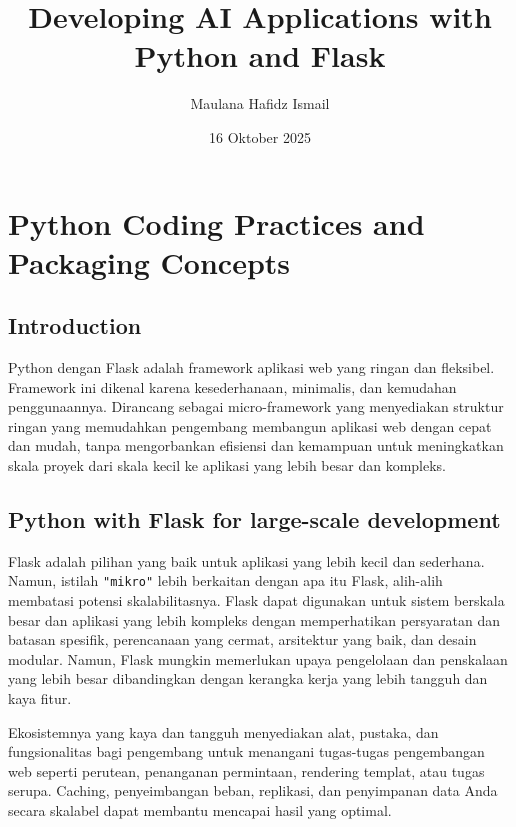 \documentclass{article}
\title{Developing AI Applications with Python and Flask}
\date{16 Oktober 2025}
\author{Maulana Hafidz Ismail}
\begin{document}
\maketitle
\newpage

\tableofcontents
\newpage
{}

\section{Python Coding Practices and Packaging Concepts}
\subsection{Introduction}
Python dengan Flask adalah framework aplikasi web yang ringan dan fleksibel. Framework ini dikenal karena kesederhanaan, minimalis, dan kemudahan penggunaannya. Dirancang sebagai micro-framework yang menyediakan struktur ringan yang memudahkan pengembang membangun aplikasi web dengan cepat dan mudah, tanpa mengorbankan efisiensi dan kemampuan untuk meningkatkan skala proyek dari skala kecil ke aplikasi yang lebih besar dan kompleks.


\subsection{Python with Flask for large-scale development}
Flask adalah pilihan yang baik untuk aplikasi yang lebih kecil dan sederhana. Namun, istilah \verb|"mikro"| lebih berkaitan dengan apa itu Flask, alih-alih membatasi potensi skalabilitasnya. Flask dapat digunakan untuk sistem berskala besar dan aplikasi yang lebih kompleks dengan memperhatikan persyaratan dan batasan spesifik, perencanaan yang cermat, arsitektur yang baik, dan desain modular. Namun, Flask mungkin memerlukan upaya pengelolaan dan penskalaan yang lebih besar dibandingkan dengan kerangka kerja yang lebih tangguh dan kaya fitur.

Ekosistemnya yang kaya dan tangguh menyediakan alat, pustaka, dan fungsionalitas bagi pengembang untuk menangani tugas-tugas pengembangan web seperti perutean, penanganan permintaan, rendering templat, atau tugas serupa. Caching, penyeimbangan beban, replikasi, dan penyimpanan data Anda secara skalabel dapat membantu mencapai hasil yang optimal.
\end{document}
